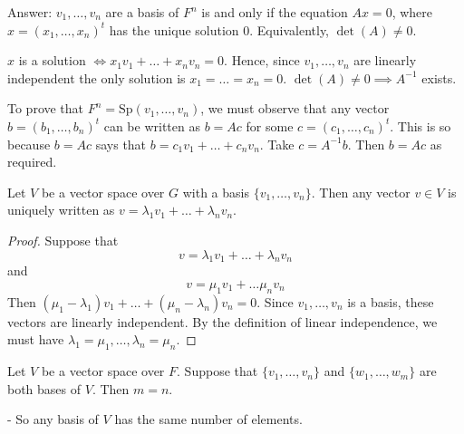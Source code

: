 \documentclass[10pt]{scrartcl}
\begin{document}
Answer: $v_1,\dots,v_n$ are a basis of $F^n$ is and only if the equation $Ax = 0$, where $x= (x_1,\dots,x_n)^t$ has the unique solution $0$. Equivalently, $\det(A) \neq 0$. 
 
 $x$ is a solution $\iff x_1v_1 + \dots + x_nv_n = 0$. Hence, since $v_1,\dots,v_n$ are linearly independent the only solution is $x_1 = \dots = x_n = 0$. $\det(A) \neq 0 \implies A^{-1}$ exists. 
 
 To prove that $F^n = \mathrm{Sp}(v_1,\dots,v_n)$, we must observe that any vector $b = (b_1,\dots,b_n)^t$ can be written as $b = Ac$ for some $c = (c_1,\dots,c_n)^t$. This is so because $b = Ac$ says that $b = c_1v_1 + \dots + c_nv_n$. Take $c = A^{-1}b$. Then $b = Ac$ as required.\\
 
 \begin{proposition}
 Let $V$ be a vector space over $G$ with a basis $\{v_1,\dots,v_n\}$. Then any vector $v \in V$ is uniquely written as $v = \lambda_1v_1 + \dots + \lambda_nv_n$. 	
 \end{proposition}
 \begin{proof}
 Suppose that 
 \[
  v = \lambda_1v_1 + \dots + \lambda_nv_n
\]
and
\[
  v = \mu_1v_1 + \dots \mu_nv_n
\]
Then $(\mu_1-\lambda_1)v_1 + \dots + (\mu_n - \lambda_n)v_n = 0$. Since $v_1,\dots,v_n$ is a basis, these vectors are linearly independent. By the definition of linear independence, we must have $\lambda_1 = \mu_1,\dots,\lambda_n = \mu_n$. 
 \end{proof}
 
 \begin{theorem}
 Let $V$ be a vector space over $F$. Suppose that $\{v_1,\dots,v_n\}$ and $\{w_1,\dots,w_m\}$ are both bases of $V$. Then $m = n$. 	
 \end{theorem}
 
 - So any basis of $V$ has the same number of elements. 
 
\end{document}

